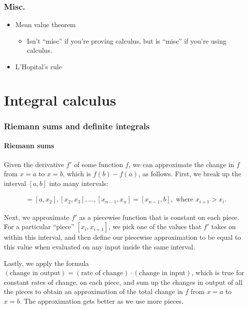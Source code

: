 \section*{Misc.}

\begin{itemize}
    \item Mean value theorem
    \begin{itemize}
        \item Isn't ``misc'' if you're proving calculus, but is ``misc'' if you're using calculus.
    \end{itemize}
    \item L'Hopital's rule
\end{itemize}

\newpage

\part*{Integral calculus}

\section*{Riemann sums and definite integrals}

\subsection*{Riemann sums}

Given the derivative $f'$ of some function $f$, we can approximate the change in $f$ from $x = a$ to $x = b$, which is $f(b) - f(a)$, as follows. First, we break up the interval $[a, b]$ into many intervals:

\begin{align*}
    [x_1, x_2] = [a, x_2], [x_2, x_3], ..., [x_{n - 1}, x_n] = [x_{n - 1}, b], \text{ where $x_{i + 1} > x_i$}.
\end{align*}

Next, we approximate $f'$ as a piecewise function that is constant on each piece. For a particular ``piece'' $[x_i, x_{i + 1}]$, we pick one of the values that $f'$ takes on within this interval, and then define our piecewise approximation to be equal to this value when evaluated on any input inside the same interval.

Lastly, we apply the formula $(\text{change in output}) = (\text{rate of change}) \cdot (\text{change in input})$, which is true for constant rates of change, on each piece, and sum up the changes in output of all the pieces to obtain an approximation of the total change in $f$ from $x = a$ to $x = b$. The approximation gets better as we use more pieces. 

